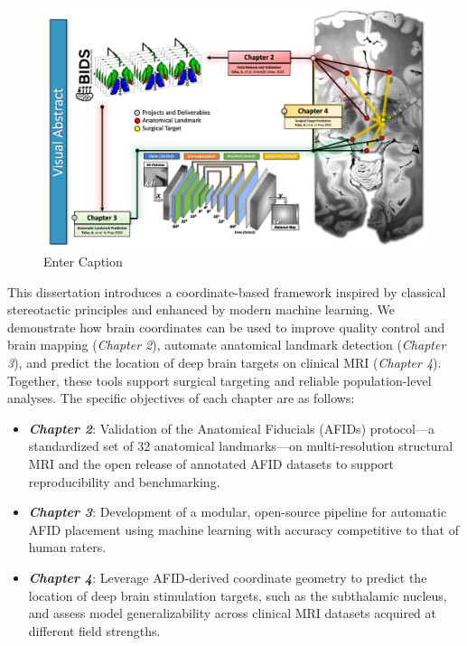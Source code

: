 \begin{figure}
    \centering
    \includegraphics[width=1\linewidth]{figs/ch1_Figure_Abstract.png}
    \caption{Enter Caption}
    \label{fig:enter-label}
\end{figure}


This dissertation introduces a coordinate-based framework inspired by classical stereotactic principles and enhanced by modern machine learning. We demonstrate how brain coordinates can be used to improve quality control and brain mapping (\textit{Chapter 2}), automate anatomical landmark detection (\textit{Chapter 3}), and predict the location of deep brain targets on clinical MRI (\textit{Chapter 4}). Together, these tools support surgical targeting and reliable population-level analyses. The specific objectives of each chapter are as follows:
\begin{itemize}
\item \textbf{\textit{Chapter 2}}: Validation of the Anatomical Fiducials (AFIDs) protocol—a standardized set of 32 anatomical landmarks—on multi-resolution structural MRI and the open release of annotated AFID datasets to support reproducibility and benchmarking.
\item \textbf{\textit{Chapter 3}}: Development of a modular, open-source pipeline for automatic AFID placement using machine learning with accuracy competitive to that of human raters.
\item \textbf{\textit{Chapter 4}}: Leverage AFID-derived coordinate geometry to predict the location of deep brain stimulation targets, such as the subthalamic nucleus, and assess model generalizability across clinical MRI datasets acquired at different field strengths.
\end{itemize}